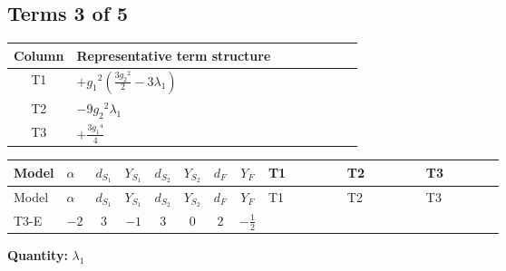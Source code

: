 \documentclass[8pt]{article}
\begin{document}
\begin{landscape}
\subsection*{Terms 3 of 5}
\begin{center}
\begin{tabular}{@{}c >{\raggedright\arraybackslash}p{0.82\linewidth}@{}}
\toprule
Column & Representative term structure \\
\midrule
T1 & \(\displaystyle +{g_1}^2 \left(\frac{3 {g_2}^2}{2}-3 {\lambda_1}\right)\) \\
\midrule
T2 & \(\displaystyle -9 {g_2}^2 {\lambda_1}\) \\
\midrule
T3 & \(\displaystyle +\frac{3 {g_1}^4}{4}\) \\
\midrule
\bottomrule
\end{tabular}
\end{center}
\smallskip
\tiny
\begin{longtable}{@{}llcccccc >{\raggedright\arraybackslash}p{0.21\linewidth} >{\raggedright\arraybackslash}p{0.21\linewidth} >{\raggedright\arraybackslash}p{0.21\linewidth}@{}}
\toprule
Model & $\alpha$ & $d_{S_1}$ & $Y_{S_1}$ & $d_{S_2}$ & $Y_{S_2}$ & $d_F$ & $Y_F$ & T1 & T2 & T3 \\
\midrule
\endfirsthead
\toprule
Model & $\alpha$ & $d_{S_1}$ & $Y_{S_1}$ & $d_{S_2}$ & $Y_{S_2}$ & $d_F$ & $Y_F$ & T1 & T2 & T3 \\
\midrule
\endhead
T3-E & $-2$ & $3$ & $-1$ & $3$ & $0$ & $2$ & $-\frac{1}{2}$ & \scriptsize\adjustbox{max width=\linewidth}{$\begin{gathered} +{g_1}^2 \left(\frac{3 {g_2}^2}{2}-3 {\lambda_1}\right)\end{gathered}$} & \scriptsize\adjustbox{max width=\linewidth}{$\begin{gathered} -9 {g_2}^2 {\lambda_1}\end{gathered}$} & \scriptsize\adjustbox{max width=\linewidth}{$\begin{gathered} +\frac{3 {g_1}^4}{4}\end{gathered}$} \\
\midrule
\bottomrule
\end{longtable}
\clearpage
\noindent\textbf{Quantity: }$\lambda_1$\par\smallskip

\end{landscape}
\end{document}
